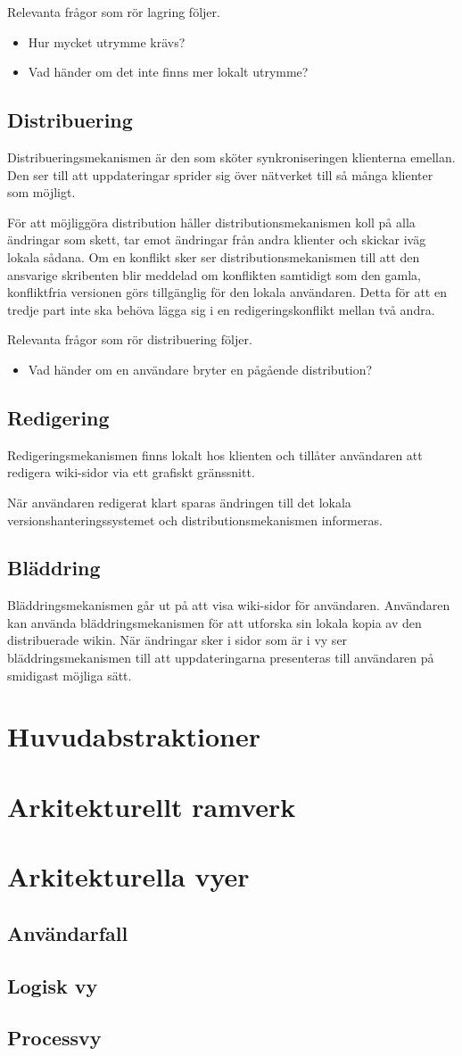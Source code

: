 Relevanta frågor som rör lagring följer.
\begin{itemize}
\item Hur mycket utrymme krävs?
\item Vad händer om det inte finns mer lokalt utrymme?
\end{itemize}
\subsection{Distribuering}
Distribueringsmekanismen är den som sköter synkroniseringen klienterna emellan. Den ser till att uppdateringar sprider sig över nätverket till så många klienter som möjligt.

För att möjliggöra distribution håller distributionsmekanismen koll på alla ändringar som skett, tar emot ändringar från andra klienter och skickar iväg lokala sådana. Om en konflikt sker ser distributionsmekanismen till att den ansvarige skribenten blir meddelad om konflikten samtidigt som den gamla, konfliktfria versionen görs tillgänglig för den lokala användaren. Detta för att en tredje part inte ska behöva lägga sig i en redigeringskonflikt mellan två andra.

Relevanta frågor som rör distribuering följer.
\begin{itemize}
\item Vad händer om en användare bryter en pågående distribution?
\end{itemize}
\subsection{Redigering}
Redigeringsmekanismen finns lokalt hos klienten och tillåter användaren att redigera wiki-sidor via ett grafiskt gränssnitt.

När användaren redigerat klart sparas ändringen till det lokala versionshanteringssystemet och distributionsmekanismen informeras.
\subsection{Bläddring}
Bläddringsmekanismen går ut på att visa wiki-sidor för användaren. Användaren kan använda bläddringsmekanismen för att utforska sin lokala kopia av den distribuerade wikin. När ändringar sker i sidor som är i vy ser bläddringsmekanismen till att uppdateringarna presenteras till användaren på smidigast möjliga sätt.
\section{Huvudabstraktioner}
\section{Arkitekturellt ramverk}
\section{Arkitekturella vyer}
\subsection{Användarfall}
\subsection{Logisk vy}
\subsection{Processvy}

